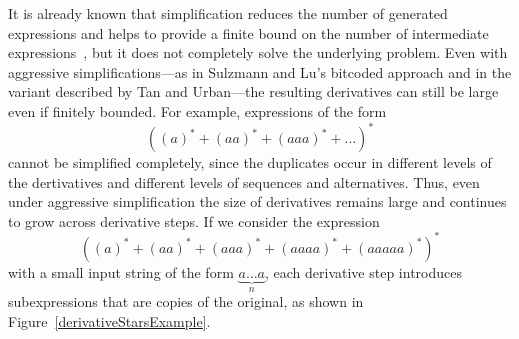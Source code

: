 \documentclass[12pt]{article}
\begin{document}
It is already known that simplification reduces the number of generated
expressions and helps to provide a finite bound on the number of intermediate
expressions~\cite{Sulzmann2014,TanAndUrban2023}, but it does not completely
solve the underlying problem. Even with aggressive simplifications---as in
Sulzmann and Lu’s bitcoded approach and in the variant described by Tan and
Urban---the resulting derivatives can still be large even if
finitely bounded. For example, expressions of the form
\[
((a)^* + (aa)^* + (aaa)^* + \dots )^*
\]
cannot be simplified completely, since the duplicates occur in different
levels of the dertivatives and different levels of sequences and alternatives.
Thus, even under aggressive simplification the size of
derivatives remains large and continues to grow across derivative steps.
If we consider the expression
\[
((a)^* + (aa)^* + (aaa)^* + (aaaa)^* + (aaaaa)^*)^*
\]
with a small input string of the form $ \underbrace{a \dots a}_n$, each derivative step
introduces subexpressions that are copies of the original, as shown in 
Figure~\ref{derivativeStarsExample}.
\end{document}

